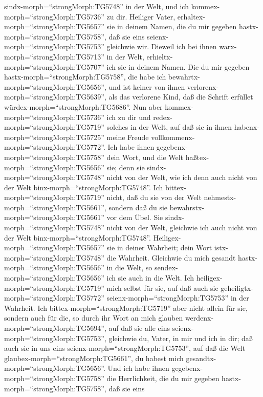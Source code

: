 sindx-morph=``strongMorph:TG5748'' in der Welt, und ich
kommex-morph=``strongMorph:TG5736'' zu dir. Heiliger Vater,
erhaltex-morph=``strongMorph:TG5657'' sie in deinem Namen, die du mir
gegeben hastx-morph=``strongMorph:TG5758'', daß sie eins
seienx-morph=``strongMorph:TG5753'' gleichwie wir.  Dieweil
ich bei ihnen warx-morph=``strongMorph:TG5713'' in der Welt,
erhieltx-morph=``strongMorph:TG5707'' ich sie in deinem Namen. Die du
mir gegeben hastx-morph=``strongMorph:TG5758'', die habe ich
bewahrtx-morph=``strongMorph:TG5656'', und ist keiner von ihnen
verlorenx-morph=``strongMorph:TG5639'', als das verlorene Kind, daß die
Schrift erfüllet würdex-morph=``strongMorph:TG5686''.  Nun
aber kommex-morph=``strongMorph:TG5736'' ich zu dir und
redex-morph=``strongMorph:TG5719'' solches in der Welt, auf daß sie in
ihnen habenx-morph=``strongMorph:TG5725'' meine Freude
vollkommenx-morph=``strongMorph:TG5772''.  Ich habe ihnen
gegebenx-morph=``strongMorph:TG5758'' dein Wort, und die Welt
haßtex-morph=``strongMorph:TG5656'' sie; denn sie
sindx-morph=``strongMorph:TG5748'' nicht von der Welt, wie ich denn auch
nicht von der Welt binx-morph=``strongMorph:TG5748''.  Ich
bittex-morph=``strongMorph:TG5719'' nicht, daß du sie von der Welt
nehmestx-morph=``strongMorph:TG5661'', sondern daß du sie
bewahrstx-morph=``strongMorph:TG5661'' vor dem Übel.  Sie
sindx-morph=``strongMorph:TG5748'' nicht von der Welt, gleichwie ich
auch nicht von der Welt binx-morph=``strongMorph:TG5748''. 
Heiligex-morph=``strongMorph:TG5657'' sie in deiner Wahrheit; dein Wort
istx-morph=``strongMorph:TG5748'' die Wahrheit.  Gleichwie
du mich gesandt hastx-morph=``strongMorph:TG5656'' in die Welt, so
sendex-morph=``strongMorph:TG5656'' ich sie auch in die Welt.
 Ich heiligex-morph=``strongMorph:TG5719'' mich selbst für
sie, auf daß auch sie geheiligtx-morph=``strongMorph:TG5772''
seienx-morph=``strongMorph:TG5753'' in der Wahrheit.  Ich
bittex-morph=``strongMorph:TG5719'' aber nicht allein für sie, sondern
auch für die, so durch ihr Wort an mich glauben
werdenx-morph=``strongMorph:TG5694'',  auf daß sie alle
eins seienx-morph=``strongMorph:TG5753'', gleichwie du, Vater, in mir
und ich in dir; daß auch sie in uns eins
seienx-morph=``strongMorph:TG5753'', auf daß die Welt
glaubex-morph=``strongMorph:TG5661'', du habest mich
gesandtx-morph=``strongMorph:TG5656''.  Und ich habe ihnen
gegebenx-morph=``strongMorph:TG5758'' die Herrlichkeit, die du mir
gegeben hastx-morph=``strongMorph:TG5758'', daß sie eins
